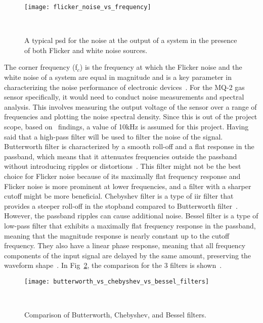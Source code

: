 \begin{figure}[H]
    \centering
    \texttt{[image: flicker\_noise\_vs\_frequency]}
    \caption{A typical \acrshort{psd} for the noise at the output of a system in the presence of both Flicker and white noise sources.}
~\label{fig:flicker_noise_vs_frequency}
\end{figure}

The corner frequency (f$_{c}$) is the frequency at which the Flicker noise and the white noise of a system are equal in magnitude and is a key parameter in characterizing the noise performance of electronic devices~\cite{smulko_2024}. For the MQ-2 gas sensor specifically, it would need to conduct noise measurements and spectral analysis. This involves measuring the output voltage of the sensor over a range of frequencies and plotting the noise spectral density. Since this is out of the project scope, based on~\cite{smulko_2024} findings, a value of 10kHz is assumed for this project. Having said that a high-pass filter will be used to filter the noise of the signal. \\

Butterworth filter is characterized by a smooth roll-off and a flat response in the passband, which means that it attenuates frequencies outside the passband without introducing ripples or distortions~\cite{ruofei_2021}. This filter might not be the best choice for Flicker noise because of its maximally flat frequency response and Flicker noise is more prominent at lower frequencies, and a filter with a sharper cutoff might be more beneficial. Chebyshev filter is a type of \acrfull{iir} filter that provides a steeper roll-off in the stopband compared to Butterworth filter~\cite{podder_2014}. However, the passband ripples can cause additional noise. Bessel filter is a type of low-pass filter that exhibits a maximally flat frequency response in the passband, meaning that the magnitude response is nearly constant up to the cutoff frequency. They also have a linear phase response, meaning that all frequency components of the input signal are delayed by the same amount, preserving the waveform shape~\cite{ashu_2021}. In Fig~\ref{fig:butterworth_vs_chebyshev_vs_bessel_filters}, the comparison for the 3 filters is shown~\cite{kikkert_2008}. \\

\begin{figure}[H]
    \centering
    \texttt{[image: butterworth\_vs\_chebyshev\_vs\_bessel\_filters]}
    \caption{Comparison of Butterworth, Chebyshev, and Bessel filters.}
~\label{fig:butterworth_vs_chebyshev_vs_bessel_filters}
\end{figure}

